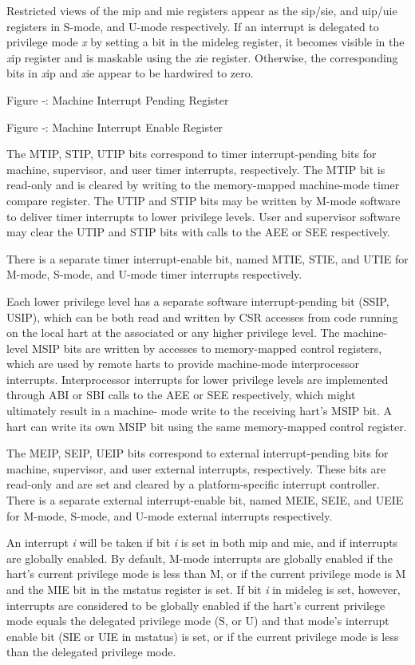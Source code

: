 Restricted views of the mip and mie registers appear as the sip/sie, and
uip/uie registers in S-mode, and U-mode respectively. If an interrupt is
delegated to privilege mode \emph{x} by setting a bit in the mideleg
register, it becomes visible in the \emph{x}ip register and is maskable
using the \emph{x}ie register. Otherwise, the corresponding bits in
\emph{x}ip and \emph{x}ie appear to be hardwired to zero.

\missingfigure{}

Figure ‑: Machine Interrupt Pending Register

\missingfigure{}
Figure ‑: Machine Interrupt Enable Register

The MTIP, STIP, UTIP bits correspond to timer interrupt-pending bits for
machine, supervisor, and user timer interrupts, respectively. The MTIP
bit is read-only and is cleared by writing to the memory-mapped
machine-mode timer compare register. The UTIP and STIP bits may be
written by M-mode software to deliver timer interrupts to lower
privilege levels. User and supervisor software may clear the UTIP and
STIP bits with calls to the AEE or SEE respectively.

There is a separate timer interrupt-enable bit, named MTIE, STIE, and
UTIE for M-mode, S-mode, and U-mode timer interrupts respectively.

Each lower privilege level has a separate software interrupt-pending bit
(SSIP, USIP), which can be both read and written by CSR accesses from
code running on the local hart at the associated or any higher privilege
level. The machine-level MSIP bits are written by accesses to
memory-mapped control registers, which are used by remote harts to
provide machine-mode interprocessor interrupts. Interprocessor
interrupts for lower privilege levels are implemented through ABI or SBI
calls to the AEE or SEE respectively, which might ultimately result in a
machine- mode write to the receiving hart's MSIP bit. A hart can write
its own MSIP bit using the same memory-mapped control register.

The MEIP, SEIP, UEIP bits correspond to external interrupt-pending bits
for machine, supervisor, and user external interrupts, respectively.
These bits are read-only and are set and cleared by a platform-specific
interrupt controller. There is a separate external interrupt-enable bit,
named MEIE, SEIE, and UEIE for M-mode, S-mode, and U-mode external
interrupts respectively.

An interrupt \emph{i} will be taken if bit \emph{i} is set in both mip
and mie, and if interrupts are globally enabled. By default, M-mode
interrupts are globally enabled if the hart's current privilege mode is
less than M, or if the current privilege mode is M and the MIE bit in
the mstatus register is set. If bit \emph{i} in mideleg is set, however,
interrupts are considered to be globally enabled if the hart's current
privilege mode equals the delegated privilege mode (S, or U) and that
mode's interrupt enable bit (SIE or UIE in mstatus) is set, or if the
current privilege mode is less than the delegated privilege mode.

